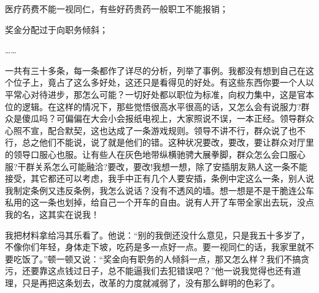 \documentclass[12pt,oneside]{book}
\begin{document}
医疗药费不能一视同仁，有些好药贵药一般职工不能报销；

奖金分配过于向职务倾斜；

\ldots\ldots{}

一共有三十多条，每一条都作了详尽的分析，列举了事例。我都没有想到自己在这个位子上，竟占了这么多好处，这还只是看得见的好处。有这些东西你要一个人以平常心对待进步，那怎么可能？一切好处都以职位为标准，向权力集中，这是官本位的逻辑。在这样的情况下，那些觉悟很高水平很高的话，又怎么会有说服力?群众是傻瓜吗？可偏偏在大会小会报纸电视上，大家照说不误，一本正经。领导群众心照不宣，配合默契，这也达成了一条游戏规则。领导不讲不行，群众说了也不行，总之他们不能说，说了就是他们的错。这种状况要改，要改，要让群众对厅里的领导口服心也服。让有些人在灰色地带纵横驰骋大展拳脚，群众怎么会口服心服?干群关系怎么可能融洽?要改，要改!我想一想，除了安插朋友熟人这一条不能接受，其它都还可以考虑，我手中正有几个人要安插，条例中定这么一条，别人说我制定条例又违反条例，我怎么说话？没有不透风的墙。想一想是不是干脆连公车私用的这一条也划掉，给自己一个开车的自由。说有人开了车带全家出去玩，没点我的名，这其实在说我！

我把材料拿给冯其乐看了。他说：``别的我倒还没什么意见，只是我五十多岁了，不像你们年轻，身体走下坡，吃药是多一点好一点。要一视同仁的话，我家里就不要吃饭了。''顿一顿又说：``奖金向有职务的人倾斜一点，那又怎么样？我们不搞贪污，还要靠这点钱过日子，总不能逼我们去犯错误吧？''他一说我觉得也还有道理，只是再把这条划去，改革的力度就减弱了，没有那么鲜明的色彩了。
\end{document}
